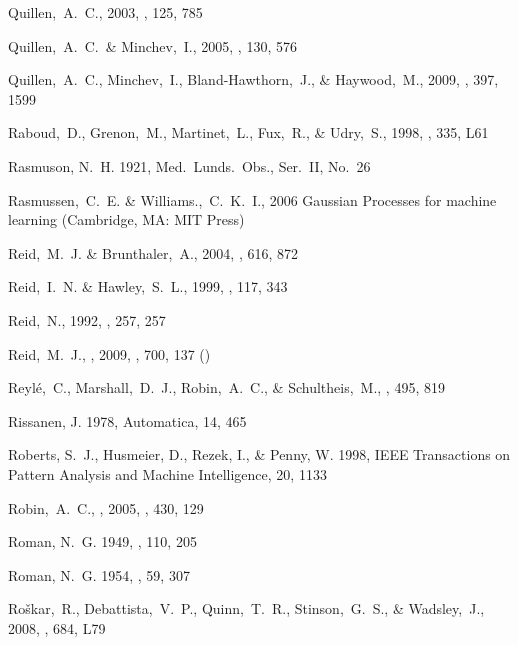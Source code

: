 \begin{thebibliography}{99}
  Quillen,~A.~C., 2003, 
  \aj, 125, 785

  Quillen,~A.~C.~\& Minchev,~I., 2005,
  \aj, 130, 576

  Quillen,~A.~C., Minchev,~I., Bland-Hawthorn,~J., \& Haywood,~M., 2009, \mnras, 397, 1599

  Raboud,~D., Grenon,~M., Martinet,~L., Fux,~R., \& Udry,~S., 1998,
  \aap, 335, L61

{Rasmuson}, N.~H. 1921, Med.~Lunds.~Obs., {Ser.~II}, {No.~26}

  Rasmussen,~C.~E. \& Williams.,~C.~K.~I., 2006
  Gaussian Processes for machine learning (Cambridge, MA: MIT Press)

  Reid,~M.~J. \& Brunthaler,~A., 2004,
  \apj, 616, 872

  Reid,~I.~N. \& Hawley,~S.~L., 1999,
  \aj, 117, 343

  Reid,~N., 1992,
  \mnras, 257, 257

 Reid,~M.~J., \etal, 2009,
  \apj, 700, 137 (\reid)

  Reyl\'{e},~C., Marshall,~D.~J., Robin,~A.~C., \& Schultheis,~M., \aap, 495, 819

{Rissanen}, J. 1978, {Automatica}, 14, 465

{Roberts}, S.~J., {Husmeier}, D., {Rezek}, I., \& {Penny}, W. 1998, IEEE
  Transactions on Pattern Analysis and Machine Intelligence, 20, 1133

  Robin,~A.~C., \etal, 2005,
  \aap, 430, 129

{Roman}, N.~G. 1949, \apj, 110, 205

{Roman}, N.~G. 1954, \aj, 59, 307

  Ro{\v s}kar,~R., Debattista,~V.~P., Quinn,~T.~R., Stinson,~G.~S., \& Wadsley,~J., 2008,
  \apjl, 684, L79


\end{thebibliography}
